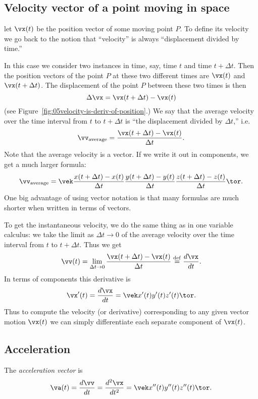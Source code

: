 \subsection{Velocity vector of a point moving in space} %
\label{sec:velocity-of-vector-motion}
let $\vx(t)$ be the position vector of some moving point $P$.  To define its velocity
we go back to the notion that ``velocity'' is always ``displacement divided by time.''

In this case we consider two instances in time, say, time $t$ and time $t+ \Delta t$.
Then the position vectors of the point $P$ at these two different times are $\vx(t)$
and $\vx(t+\Delta t)$.  The displacement of the point $P$ between these two times is
then
\[
  \Delta \vx = \vx(t+\Delta t) - \vx(t)
\]
(see Figure~\ref{fig:05velocity-is-deriv-of-position}.)  We say that the average
velocity over the time interval from $t$ to $t+\Delta t$ is ``the displacement
divided by $\Delta t$,'' i.e.
\[
  \vv_{\rm average} = \frac{\vx(t+\Delta t) - \vx(t)}{\Delta t}.
\]
Note that the average velocity is a vector.  If we write it out in components, we get
a much larger formula:
\[
  \vv_{\rm average} = \vek
  \dfrac{x(t+\Delta t) - x(t)}{\Delta t} \\[2ex]
  \dfrac{y(t+\Delta t) - y(t)}{\Delta t} \\[2ex]
  \dfrac{z(t+\Delta t) - z(t)}{\Delta t}
  \tor.
\]
One big advantage of using vector notation is that many formulas are much shorter when
written in terms of vectors.

To get the instantaneous velocity, we do the same thing as in one variable calculus:
we take the limit as $\Delta t\to0$ of the average velocity over the time interval
from $t$ to $t+\Delta t$.  Thus we get
\begin{equation}
  \vv(t) = \lim_{\Delta t\to0} \frac{\vx(t+\Delta t) - \vx(t)}{\Delta t} 
  \stackrel{\rm def}=
  \frac{d\vx}{dt}.
  \label{eq:velocity-of-vector-motion}
\end{equation}
In terms of components this derivative is 
\[
  \vx'(t)= \frac{d\vx}{dt} = \vek x'(t) \\ y'(t) \\ z'(t) \tor.
\]
Thus to compute the velocity (or derivative) corresponding to any given vector motion
$\vx(t)$ we can simply differentiate each separate component of $\vx(t)$.

\subsection{Acceleration} %
The \emph{acceleration vector} is
\[
\va(t) = \frac{d\vv}{dt} = \frac{d^2\vx} {dt^2} = \vek x''(t)\\ y''(t) \\ z''(t) \tor.
\]


